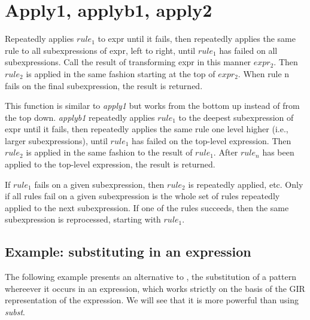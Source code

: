 \documentclass[../Maxima_Workbook.tex]{subfiles}
\begin{document}
\section{Apply1, applyb1, apply2}

 \hfill \tcr{[function]}

\lz Repeatedly applies $ rule_1 $ to expr until it fails, then repeatedly applies the same rule to all subexpressions of expr, left to right, until $ rule_1 $ has failed on all subexpressions. Call the result of transforming expr in this manner $ expr_2 $. Then $ rule_2 $ is applied in the same fashion starting at the top of $ expr_2 $. When rule n fails on the final subexpression, the result is returned.

\lzz {} \hfill \tcr{[function]}

\lz This function is similar to \emph{apply1} but works from the bottom up instead of from the top down. \emph{applyb1} repeatedly applies $ rule_1 $ to the deepest subexpression of expr until it fails, then repeatedly applies the same rule one level higher (i.e., larger subexpressions), until $ rule_1 $ has failed on the top-level expression. Then $ rule_2 $ is applied in the same fashion to the result of $ rule_1 $. After $ rule_n $ has been applied to the top-level expression, the result is returned.

\lzz {} \hfill \tcr{[function]}

\lz If $ rule_1 $ fails on a given subexpression, then $ rule_2 $ is repeatedly applied, etc. Only if all rules fail on a given subexpression is the whole set of rules repeatedly applied to the next subexpression. If one of the rules succeeds, then the same subexpression is reprocessed, starting with $ rule_1 $.

\subsection{Example: substituting in an expression}\label{RP3}

The following example presents an alternative to , the substitution of a pattern whereever it occurs in an expression, which works strictly on the basis of the GIR representation of the expression. We will see that it is more powerful than using \emph{subst}.
\end{document}
